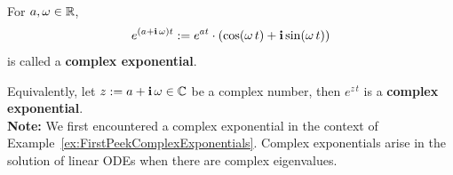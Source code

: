 \begin{tcolorbox}[colback=mylightblue, title = {\bf Complex Exponetials}, breakable]

\begin{definition}
\label{def:complexExponentials}
 For $a, \omega \in \mathbb R$,
\begin{equation}
    e^{(a + \mathop{\bm{\mathrm i}} \omega)t}:= e^{at} \cdot \left( \cos(\omega\, t) + \mathop{\bm{\mathrm i}} \sin(\omega\, t) \right)
\end{equation}
is called a \textbf{complex exponential}. 
\end{definition}


\bigskip

Equivalently, let $z:=a + \mathop{\bm{\mathrm i}} \omega \in \mathbb C$ be a complex number, then $e^{z\, t}$ is a \textbf{complex exponential}.\\

\textbf{Note:} We first encountered a complex exponential in the context of Example~\ref{ex:FirstPeekComplexExponentials}. Complex exponentials arise in the solution of linear ODEs when there are complex eigenvalues.
 \end{tcolorbox}
 
 \bigskip
 
